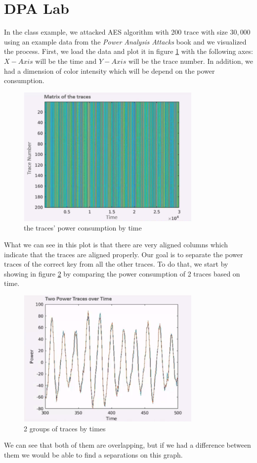 \section{DPA Lab}
In the class example, we attacked AES algorithm with 200 trace with size $30,000$ using an example data from the \textit{Power Analysis Attacks} book and we visualized the process.
First, we load the data and plot it in figure \ref{fig:traceByTime} with the following axes: $X-Axis$ will be the time and $Y-Axis$ will be the trace number. In addition, we had a dimension of color intensity which will be depend on the power consumption.
\begin{figure}[H]
\centering
\includegraphics[width=0.8\textwidth]{images/Lecture6/traceByTime.png}
\caption{the traces' power consumption by time}
\label{fig:traceByTime}
\end{figure}
What we can see in this plot is that there are very aligned columns which indicate that the traces are aligned properly.
Our goal is to separate the power traces of the correct key from all the other traces. To do that, we start by showing in figure \ref{fig:2traces-by-time} by comparing the power consumption of 2 traces based on time.
\begin{figure}[H]
\centering
\includegraphics[width=0.8\textwidth]{images/Lecture6/2traces-by-time.png}
\caption{2 groups of traces by times}
\label{fig:2traces-by-time}
\end{figure}
We can see that both of them are overlapping, but if we had a difference between them we would be able to find a separations on this graph.

